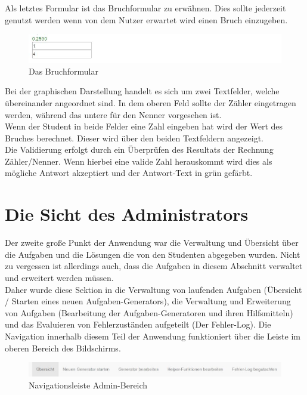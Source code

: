 Als letztes Formular ist das Bruchformular zu erwähnen. Dies sollte jederzeit genutzt werden wenn von dem Nutzer erwartet wird einen Bruch einzugeben.

\begin{figure}[htp]     %
\centering
\includegraphics[width=1\textwidth]{bilder/FractureForm} 
\caption[Das Bruchformular]{Das Bruchformular}
\end{figure} 

Bei der graphischen Darstellung handelt es sich um zwei Textfelder, welche übereinander angeordnet sind. In dem oberen Feld sollte der Zähler eingetragen werden, während das untere für den Nenner vorgesehen ist. \\
Wenn der Student in beide Felder eine Zahl eingeben hat wird der Wert des Bruches berechnet. Dieser wird über den beiden Textfeldern angezeigt. \\

Die Validierung erfolgt durch ein Überprüfen des Resultats der Rechnung Zähler/Nenner. Wenn hierbei eine valide Zahl herauskommt wird dies als mögliche Antwort akzeptiert und der Antwort-Text in grün gefärbt.


\section{Die Sicht des Administrators}

Der zweite große Punkt der Anwendung war die Verwaltung und Übersicht über die Aufgaben und die Lösungen die von den Studenten abgegeben wurden. Nicht zu vergessen ist allerdings auch, dass die Aufgaben in diesem Abschnitt verwaltet und erweitert werden müssen. \\

Daher wurde diese Sektion in die Verwaltung von laufenden Aufgaben (Übersicht / Starten eines neuen Aufgaben-Generators), die Verwaltung und Erweiterung von Aufgaben (Bearbeitung der Aufgaben-Generatoren und ihren Hilfsmitteln) und das Evaluieren von Fehlerzuständen aufgeteilt (Der Fehler-Log). Die Navigation innerhalb diesem Teil der Anwendung funktioniert über die Leiste im oberen Bereich des Bildschirms. \\
\begin{figure}[htp]     %
\centering
\includegraphics[width=1\textwidth]{bilder/NavBar} 
\caption[Navigationsleiste Admin-Bereich]{Navigationsleiste Admin-Bereich}
\end{figure} 

